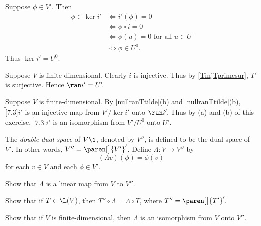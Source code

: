 \begin{Solution}
\begin{subtheorem}
\item
Suppose $\phi \in V'\!$. Then
\begin{align*}
\phi \in \ker i' &\iff i' \! (\phi) = 0 \\
&\iff \phi \circ i = 0 \\
&\iff \phi(u) = 0 \text{\ for all\ } u \in U \\
&\iff \phi \in U^0\!.
\end{align*}
Thus $\ker i' = U^0\!$.

\item
Suppose $V$ is finite-dimensional. Clearly $i$ is injective. Thus by \ref{TinjTprimesur}, $T'$ is surjective. Hence $\ran i' = U'\!$.

\item
Suppose $V$ is finite-dimensional. By \ref{nullranTtilde}(b) and \ref{nullranTtilde}(b), $\tilde[7.3]{i'}$ is an injective map from $V'/\ker i'$ onto $\ran i'\!$. Thus by (a) and (b) of this exercise, $\tilde[7.3]{i'}$ is an isomorphism from $V'/U^0$ onto $U'\!$.
\end{subtheorem}
\end{Solution}

\pagebreak[3]

\exercise
The \emph{double dual space} of $V\1$, denoted by $V''\!$, is defined to be the dual space of~$V'\!$. In other words,
$V'' = {\paren[\big]{V'}}'$\!. Define $\Lambda \colon V \to V''$ by
\[
(\Lambda v)(\phi) = \phi(v)
\]
for each $v \in V$ and each $\phi \in V'\!$.
\begin{subtheorem}
\item
Show that $\Lambda$ is a linear map from $V$ to $V''\!$.
\item
Show that if $T \in \L(V)$, then $T'' \circ \Lambda = \Lambda \circ T$, where $T'' = {\paren[\big]{T'}}'\!$.
\item
Show that if $V$ is finite-dimensional, then $\Lambda$ is an isomorphism from $V$ onto $V''\!$.
\end{subtheorem}

